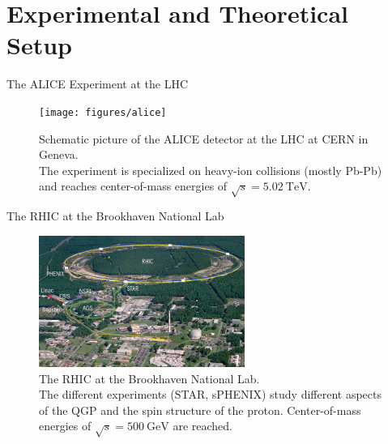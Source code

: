 \section{Experimental and Theoretical Setup}

\begin{frame}{The ALICE Experiment at the LHC}
\begin{figure}[H]
\centering
\texttt{[image: figures/alice]}
\caption{Schematic picture of the ALICE detector at the LHC at CERN in Geneva.\footnotemark \\
The experiment is specialized on heavy-ion collisions (mostly Pb-Pb) and reaches center-of-mass energies of $\sqrt{s} = 5.02\ \mathrm{TeV}$.}	
\end{figure}
\end{frame}

\begin{frame}{The RHIC at the Brookhaven National Lab}
\begin{figure}[H]
\centering
\includegraphics[width = 0.6\textwidth]{figures/rhic_overview}
\caption{The RHIC at the Brookhaven National Lab.\footnotemark \\ The different experiments (STAR, sPHENIX\footnotemark) study different aspects of the QGP and the spin structure of the proton. Center-of-mass energies of $\sqrt{s} = 500\ \mathrm{GeV}$ are reached.}	
\end{figure}
\end{frame}

